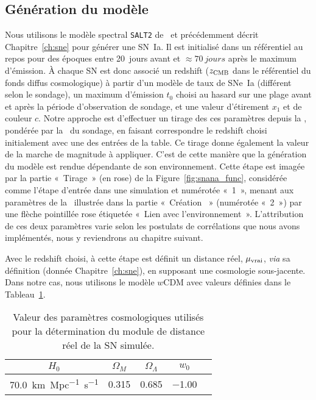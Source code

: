 \documentclass[../main/main.tex]{subfiles}
\begin{document}
\subsection{Génération du modèle}\label{ssec:simsn}

Nous utilisons le modèle spectral \texttt{SALT2} de~\cite{guy2007} et
précédemment décrit Chapitre~\ref{ch:sne} pour générer une SN~Ia. Il est
initialisé dans un référentiel au repos pour des époques entre \SI{20}{jours}
avant et $\approx\SI{70}{jours}$ après le maximum d'émission. À chaque SN est
donc associé un redshift ($z_{\rm CMB}$ dans le référentiel du fonds diffus
cosmologique) à partir d'un modèle de taux de SNe~Ia (différent selon le
sondage), un maximum d'émission $t_0$ choisi au hasard sur une plage avant et
après la période d'observation de sondage, et une valeur d'étirement $x_1$ et de
couleur $c$. Notre approche est d'effectuer un tirage des ces paramètres depuis
la \hostlib, pondérée par la \wgtmap\ du sondage, en faisant correspondre le
redshift choisi initialement avec une des entrées de la table. Ce tirage donne
également la valeur de la marche de magnitude à appliquer. C'est de cette
manière que la génération du modèle est rendue dépendante de son environnement.
Cette étape est imagée par la partie «~Tirage~» (en rose) de la
Figure~\ref{fig:snana_func}, considérée comme l'étape d'entrée dans une
simulation et numérotée «~1~», menant aux paramètres de la \hostlib\ illustrée
dans la partie «~Création \hostlib~» (numérotée «~2~») par une flèche pointillée
rose étiquetée «~Lien avec l'environnement~». L'attribution de ces deux
paramètres varie selon les postulats de corrélations que nous avons implémentés,
nous y reviendrons au chapitre suivant.

Avec le redshift choisi, à cette étape est définit un distance réel, $\mu_{\rm
vrai}$, \textit{via} sa définition (donnée Chapitre~\ref{ch:sne}), en supposant
une cosmologie sous-jacente. Dans notre cas, nous utilisons le modèle
$w$CDM avec valeurs définies dans le Tableau~\ref{tab:cosmoinput}.

\begin{table}[ht]
    \centering
    \caption[Valeur des paramètres cosmologiques utilisés pour la détermination
    du module de distance réel de la SN simulée]{Valeur des paramètres
        cosmologiques utilisés pour la détermination du module de distance réel
    de la SN simulée.}
    \label{tab:cosmoinput}
    \begin{tabular}{ccccc}
        \toprule
        $H_0$ & $\Omega_M$ & $\Omega_\Lambda$ & $w_0$ \\
        \midrule
        \SI{70.0}{km.Mpc^{-1}.s^{-1}} & \num{0.315} & \num{0.685} & \num{-1.00}\\ 
        \bottomrule
    \end{tabular}
\end{table}
\end{document}
